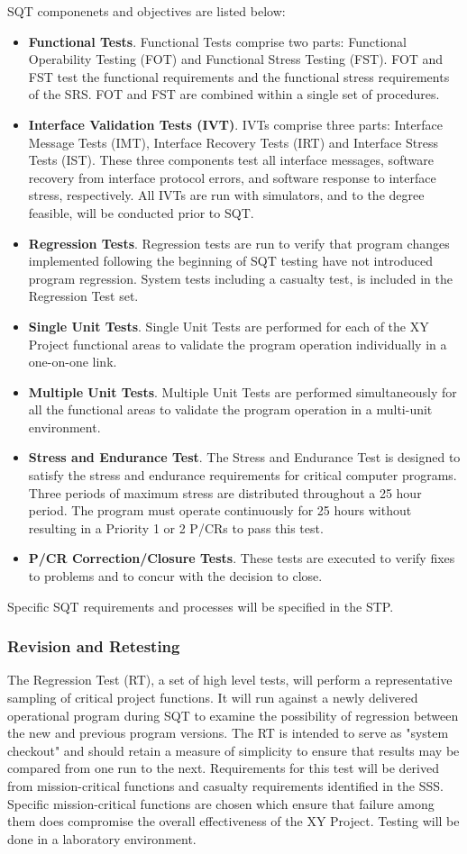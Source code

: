 \documentclass[a4paper, 11pt]{article}
\begin{document}
SQT componenets and objectives are listed below:
\begin{itemize}
	\item \textbf{Functional Tests}. Functional Tests comprise two parts: Functional Operability Testing	(FOT) and Functional Stress Testing (FST). FOT and FST test the functional	requirements and the functional stress requirements of the SRS. FOT and FST are	combined within a single set of procedures.
	\item \textbf{Interface Validation Tests (IVT)}. IVTs comprise three parts: Interface Message Tests (IMT), Interface Recovery Tests (IRT) and Interface Stress Tests (IST). These three components test all interface messages, software recovery from interface protocol errors,
	and software response to interface stress, respectively. All IVTs are run with simulators, and to the degree feasible, will be conducted prior to SQT.
	\item \textbf{Regression Tests}. Regression tests are run to verify that program changes implemented following the beginning of SQT testing have not introduced program regression. System tests including a casualty test, is included in the Regression Test set.
	\item \textbf{Single Unit Tests}. Single Unit Tests are performed for each of the XY Project functional areas to validate the program operation individually in a one-on-one link.
	\item \textbf{Multiple Unit Tests}. Multiple Unit Tests are performed simultaneously for all the functional areas to validate the program operation in a multi-unit environment.
	\item \textbf{Stress and Endurance Test}. The Stress and Endurance Test is designed to satisfy the	stress and endurance requirements for critical computer programs. Three periods of maximum stress are distributed throughout a 25 hour period. The program must operate continuously for 25 hours without resulting in a Priority 1 or 2 P/CRs to pass this test.
	\item \textbf{P/CR Correction/Closure Tests}. These tests are executed to verify fixes to problems and to concur with the decision to close.
\end{itemize}
Specific SQT requirements and processes will be specified in the STP.

\subsubsection{Revision and Retesting}
The Regression Test (RT), a set of high level tests, will perform a representative sampling of critical project functions. It will run against a newly delivered operational program during SQT to examine the possibility of regression between the new and previous program versions.
The RT is intended to serve as "system checkout" and should retain a measure of simplicity to ensure that results may be compared from one run to the next. Requirements for this test will be derived from mission-critical functions and casualty requirements identified in the SSS. Specific mission-critical functions are chosen which ensure that failure among them does compromise the overall effectiveness of the XY Project. Testing will be done in a laboratory environment.
\end{document}
